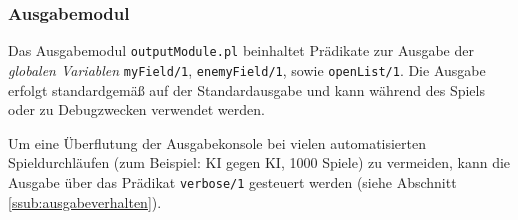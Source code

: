 	
	
	

\subsubsection{Ausgabemodul}
		Das Ausgabemodul \texttt{outputModule.pl} beinhaltet Prädikate zur Ausgabe der \textit{globalen Variablen} \texttt{myField/1},
		\texttt{enemyField/1}, sowie \texttt{openList/1}. Die Ausgabe erfolgt standardgemäß auf der Standardausgabe und kann während des Spiels oder zu
		Debugzwecken verwendet werden.

		Um eine Überflutung der Ausgabekonsole bei vielen automatisierten Spieldurchläufen (zum Beispiel: KI gegen KI, 1000 Spiele) zu vermeiden, kann 
		die Ausgabe über das Prädikat \texttt{verbose/1} gesteuert werden (siehe Abschnitt \ref{ssub:ausgabeverhalten}).

